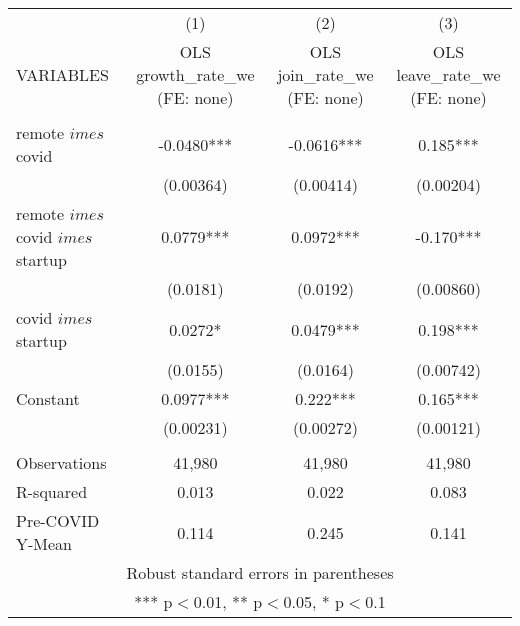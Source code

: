 \documentclass[]{article}
\begin{document}
\begin{tabular}{lccc} \hline
 & (1) & (2) & (3) \\
VARIABLES & OLS growth\_rate\_we (FE: none) & OLS join\_rate\_we (FE: none) & OLS leave\_rate\_we (FE: none) \\ \hline
 &  &  &  \\
remote $	imes$ covid & -0.0480*** & -0.0616*** & 0.185*** \\
 & (0.00364) & (0.00414) & (0.00204) \\
remote $	imes$ covid $	imes$ startup & 0.0779*** & 0.0972*** & -0.170*** \\
 & (0.0181) & (0.0192) & (0.00860) \\
covid $	imes$ startup & 0.0272* & 0.0479*** & 0.198*** \\
 & (0.0155) & (0.0164) & (0.00742) \\
Constant & 0.0977*** & 0.222*** & 0.165*** \\
 & (0.00231) & (0.00272) & (0.00121) \\
 &  &  &  \\
Observations & 41,980 & 41,980 & 41,980 \\
R-squared & 0.013 & 0.022 & 0.083 \\
 Pre-COVID Y-Mean & 0.114 & 0.245 & 0.141 \\ \hline
\multicolumn{4}{c}{ Robust standard errors in parentheses} \\
\multicolumn{4}{c}{ *** p$<$0.01, ** p$<$0.05, * p$<$0.1} \\
\end{tabular}
\end{document}

